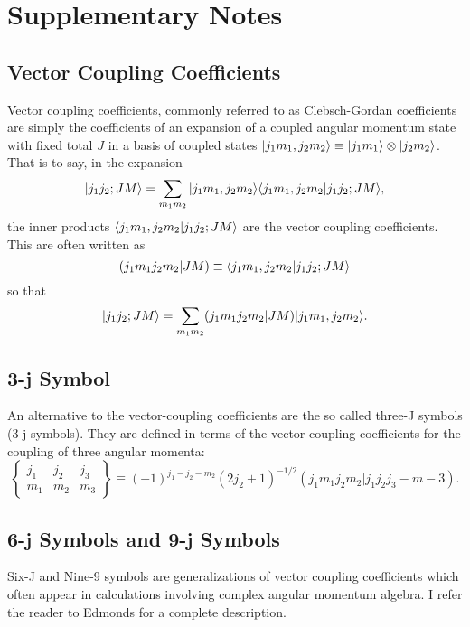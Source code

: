 \appendices
%
%
\chapter{Supplementary Notes}
\label{appendix: vc}
\section{Vector Coupling Coefficients}

Vector coupling coefficients, commonly referred to as Clebsch-Gordan coefficients
\cite{Shankar} are simply the coefficients of an expansion of a coupled angular 
momentum state with fixed total $J$ in a basis of coupled states 
$|j_1m_1,j_2m_2\rangle\equiv|j_1m_1\rangle\otimes|j_2m_2\rangle$. That is to say,
in the expansion
\begin{equation}
|j_1j_2;JM\rangle=\sum_{m_1m_2}|j_1m_1,j_2m_2\rangle\langle j_1m_1,j_2m_2|j_1j_2;JM\rangle,
\end{equation}
the inner products $\langle j_1m_1,j_2m_2|j_1j_2;JM\rangle$ are the vector coupling
coefficients. This are often written as
\begin{equation}
    (j_1m_1j_2m_2|JM)\equiv \langle j_1m_1,j_2m_2|j_1j_2;JM\rangle
\end{equation}
so that
\begin{equation}
    |j_1j_2;JM\rangle = \sum_{m_1m_2} (j_1m_1j_2m_2|JM) |j_1m_1,j_2m_2\rangle.
\end{equation}

\section{3-j Symbol}
An alternative to the vector-coupling coefficients are the so called three-J symbols
(3-j symbols). They are defined in terms of the vector coupling coefficients for the
coupling of three angular momenta\cite{Edmonds}:
\begin{equation}
    \begin{Bmatrix}j_1&j_2&j_3\\m_1&m_2&m_3\end{Bmatrix} \equiv
        (-1)^{j_1-j_2-m_2}(2j_2+1)^{-1/2}(j_1m_1j_2m_2|j_1j_2j_3-m-3).
\end{equation}

\section{6-j Symbols and 9-j Symbols}
Six-J and Nine-9 symbols are generalizations of vector coupling
coefficients which often appear in calculations involving complex angular
momentum algebra. I refer the reader to Edmonds\cite{Edmonds} for a complete description.

